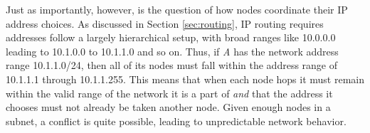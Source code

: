 \par Just as importantly, however, is the question of how nodes coordinate their IP address choices. As discussed in Section \ref{sec:routing}, IP routing requires addresses follow a largely hierarchical setup, with broad ranges like 10.0.0.0 leading to 10.1.0.0 to 10.1.1.0 and so on. Thus, if \textit{A} has the network address range 10.1.1.0/24, then all of its nodes must fall within the address range of 10.1.1.1 through 10.1.1.255. This means that when each node hops it must remain within the valid range of the network it is a part of \textit{and} that the address it chooses must not already be taken another node. Given enough nodes in a subnet, a conflict is quite possible, leading to unpredictable network behavior. 



